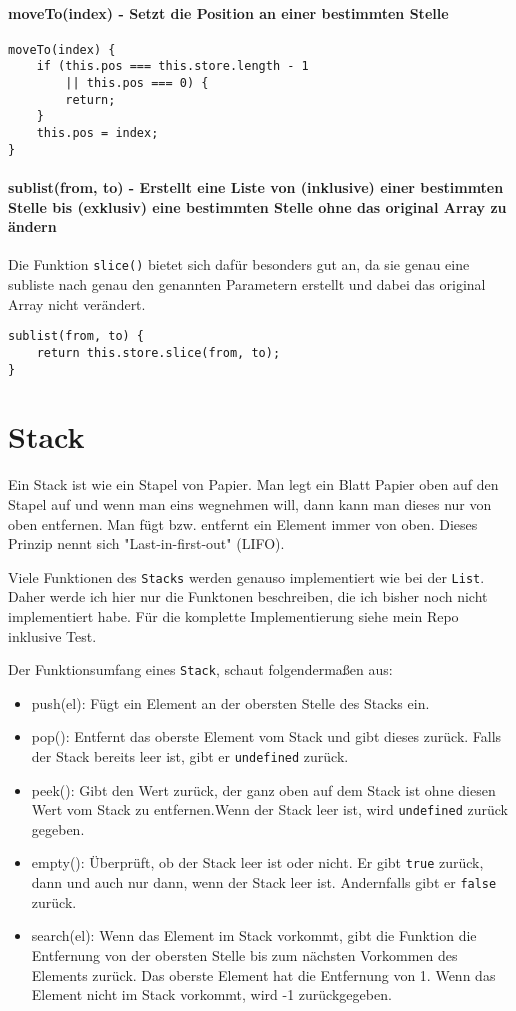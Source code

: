 \documentclass[babel]{book}
\begin{document}
\paragraph{moveTo(index) - Setzt die Position an einer bestimmten Stelle}
\begin{lstlisting}[caption=Array Konstruktor]
moveTo(index) {
	if (this.pos === this.store.length - 1 
		|| this.pos === 0) {
		return;
	}
	this.pos = index;
}
\end{lstlisting}
\paragraph{sublist(from, to) - Erstellt eine Liste von (inklusive) einer bestimmten Stelle bis (exklusiv) eine bestimmten Stelle ohne das original Array zu ändern} Die Funktion \lstinline|slice()| bietet sich dafür besonders gut an, da sie genau eine subliste nach genau den genannten Parametern erstellt und dabei das original Array nicht verändert.
\begin{lstlisting}[caption=Array Konstruktor]
sublist(from, to) {
	return this.store.slice(from, to);
}
\end{lstlisting}
\section{Stack}

Ein Stack ist wie ein Stapel von Papier. Man legt ein Blatt Papier oben auf den Stapel auf und wenn man eins wegnehmen will, dann kann man dieses nur von oben entfernen. Man fügt bzw. entfernt ein Element immer von oben. Dieses Prinzip nennt sich "Last-in-first-out" (LIFO).

Viele Funktionen des \lstinline|Stacks| werden genauso implementiert wie bei der \lstinline|List|. Daher werde ich hier nur die Funktonen beschreiben, die ich bisher noch nicht implementiert habe. Für die komplette Implementierung siehe mein Repo inklusive Test.

Der Funktionsumfang eines \lstinline|Stack|, schaut folgendermaßen aus:

\begin{itemize} 
	\item push(el): Fügt ein Element an der obersten Stelle des Stacks ein.
	\item pop(): Entfernt das oberste Element vom Stack und gibt dieses zurück. Falls der Stack bereits leer ist, gibt er \lstinline|undefined| zurück.
	\item peek(): Gibt den Wert zurück, der ganz oben auf dem Stack ist ohne diesen Wert vom Stack zu entfernen.Wenn der Stack leer ist, wird \lstinline|undefined| zurück gegeben.
	\item empty(): Überprüft, ob der Stack leer ist oder nicht. Er gibt \lstinline|true| zurück, dann und auch nur dann, wenn der Stack leer ist. Andernfalls gibt er \lstinline|false| zurück.
	\item search(el): Wenn das Element im Stack vorkommt, gibt die Funktion die Entfernung von der obersten Stelle bis zum nächsten Vorkommen des Elements zurück. Das oberste Element hat die Entfernung von 1. Wenn das Element nicht im Stack vorkommt, wird -1 zurückgegeben. 
\end{itemize}
\end{document}
